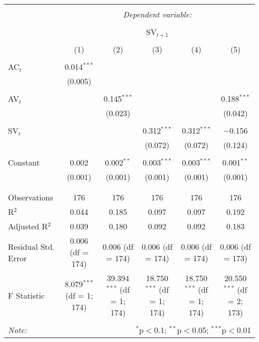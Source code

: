 
\begin{table}[!htbp] \centering 
  \caption{} 
  \label{} 
\begin{tabular}{@{\extracolsep{5pt}}lccccc} 
\\[-1.8ex]\hline 
\hline \\[-1.8ex] 
 & \multicolumn{5}{c}{\textit{Dependent variable:}} \\ 
\cline{2-6} 
\\[-1.8ex] & \multicolumn{5}{c}{SV$_{t+1}$} \\ 
\\[-1.8ex] & (1) & (2) & (3) & (4) & (5)\\ 
\hline \\[-1.8ex] 
 AC$_{t}$ & 0.014$^{***}$ &  &  &  &  \\ 
  & (0.005) &  &  &  &  \\ 
  & & & & & \\ 
 AV$_{t}$ &  & 0.145$^{***}$ &  &  & 0.188$^{***}$ \\ 
  &  & (0.023) &  &  & (0.042) \\ 
  & & & & & \\ 
 SV$_{t}$ &  &  & 0.312$^{***}$ & 0.312$^{***}$ & $-$0.156 \\ 
  &  &  & (0.072) & (0.072) & (0.124) \\ 
  & & & & & \\ 
 Constant & 0.002 & 0.002$^{**}$ & 0.003$^{***}$ & 0.003$^{***}$ & 0.001$^{**}$ \\ 
  & (0.001) & (0.001) & (0.001) & (0.001) & (0.001) \\ 
  & & & & & \\ 
\hline \\[-1.8ex] 
Observations & 176 & 176 & 176 & 176 & 176 \\ 
R$^{2}$ & 0.044 & 0.185 & 0.097 & 0.097 & 0.192 \\ 
Adjusted R$^{2}$ & 0.039 & 0.180 & 0.092 & 0.092 & 0.183 \\ 
Residual Std. Error & 0.006 (df = 174) & 0.006 (df = 174) & 0.006 (df = 174) & 0.006 (df = 174) & 0.006 (df = 173) \\ 
F Statistic & 8.079$^{***}$ (df = 1; 174) & 39.394$^{***}$ (df = 1; 174) & 18.750$^{***}$ (df = 1; 174) & 18.750$^{***}$ (df = 1; 174) & 20.550$^{***}$ (df = 2; 173) \\ 
\hline 
\hline \\[-1.8ex] 
\textit{Note:}  & \multicolumn{5}{r}{$^{*}$p$<$0.1; $^{**}$p$<$0.05; $^{***}$p$<$0.01} \\ 
\end{tabular} 
\end{table} 
